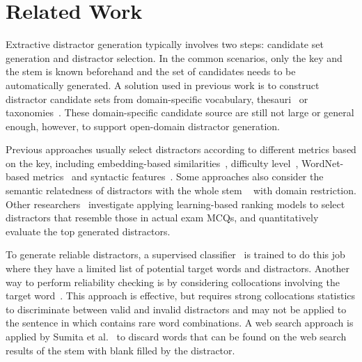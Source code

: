 \section{Related Work}
Extractive distractor generation typically involves two steps: 
candidate set generation and distractor selection.
In the common scenarios, only the key and the stem is known beforehand and the set of candidates needs to be automatically generated. A solution used in previous work is to construct distractor candidate sets from 
domain-specific vocabulary, thesauri~\cite{sumita2005measuring,smith2010gap} 
or taxonomies~\cite{mitkov2009semantic}. 
These domain-specific candidate source are still not large or general enough, however, to support open-domain distractor generation.

Previous approaches usually select distractors according to different metrics based on the key, including embedding-based similarities~\cite{guo2016questimator}, difficulty level~\cite{brown2005automatic,coniam2013preliminary}, WordNet-based metrics~\cite{mitkov2003computer} and 
syntactic features~\cite{agarwal2011automatic}.
Some approaches also consider the semantic relatedness of distractors with the whole stem ~\cite{pino2008selection,mostow2012generating} with domain restriction. Other researchers~\cite{liang2017distractor, liang2018distractor} investigate applying learning-based ranking models to select distractors that resemble those in actual exam MCQs, and quantitatively evaluate the top generated distractors.

To generate reliable distractors, a supervised classifier~\cite{lee2007automatic} is trained to do this job where they have a limited list of potential target words and distractors. 
Another way to perform reliability checking is by considering collocations 
involving the target word~\cite{smith2010gap,jiang2017distractor}. 
This approach is effective, but requires strong collocations statistics to 
discriminate between valid and invalid distractors and may not be applied to
the sentence in  which contains rare word combinations. 
A web search approach is applied by Sumita et al.~ to discard words that can be found on the web search results of the stem with blank filled by the distractor.
